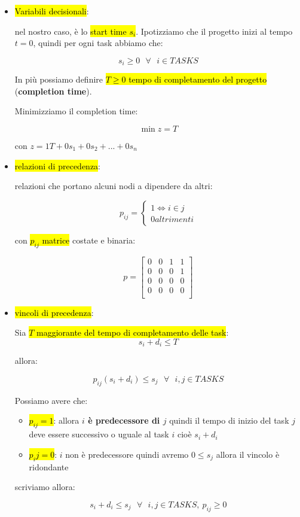 \begin{itemize}
	\item \hl{Variabili decisionali}:
		
		nel nostro caso, è lo \hl{start time $s_i$}. Ipotizziamo che il progetto inizi al tempo $t = 0$, quindi per ogni task abbiamo che:

			$$s_i \geq 0\ \ \ \forall\ \ \ i \in TASKS$$

		In più possiamo definire \hl{$T \geq 0$ tempo di completamento del progetto} (\textbf{completion time}).

		Minimizziamo il completion time:

			$$\min z = T$$

		con $z = 1T + 0s_1 + 0s_2 + ... + 0s_n$
		
		
	\item \hl{relazioni di precedenza}:
	
		relazioni che portano alcuni nodi a dipendere da altri:
		
		$$
		p_{ij}=
		\begin{cases} 
		    1 \Leftrightarrow i \in j \\ 
		    0 altrimenti
		\end{cases}$$
		
		con \hl{$p_{ij}$ matrice} costate e binaria:
		
		$$p =
		\left[ {\begin{array}{cccc}
		    0 & 0 & 1 & 1 \\
			0 & 0 & 0 & 1 \\
		    0 & 0 & 0 & 0 \\
		    0 & 0 & 0 & 0 \\
		\end{array} } \right]$$
		
	
	\item \hl{vincoli di precedenza}:
	
		Sia \hl{$T$ maggiorante del tempo di completamento delle task}:
			$$s_i + d_i \leq T$$

		allora:

			$$p_{ij} (s_i + d_i) \leq s_j\ \ \ \forall\ \ \ i,j \in TASKS$$

		Possiamo avere che:

		\begin{itemize}
			\item \hl{$p_{ij} = 1$}: allora \textbf{$i$ è predecessore di $j$} quindi il tempo di inizio del task $j$ deve essere successivo o uguale al task $i$ cioè $s_i + d_i$
	
			\item \hl{$p_ij = 0$}: $i$ non è predecessore quindi avremo $0 \leq s_j$ allora il vincolo è ridondante
		\end{itemize}
		
		scriviamo allora:
 
		$$s_i + d_i \leq s_j\ \ \ \forall\ \ \ i,j \in TASKS,\ p_{ij} \geq 0$$


\end{itemize}


